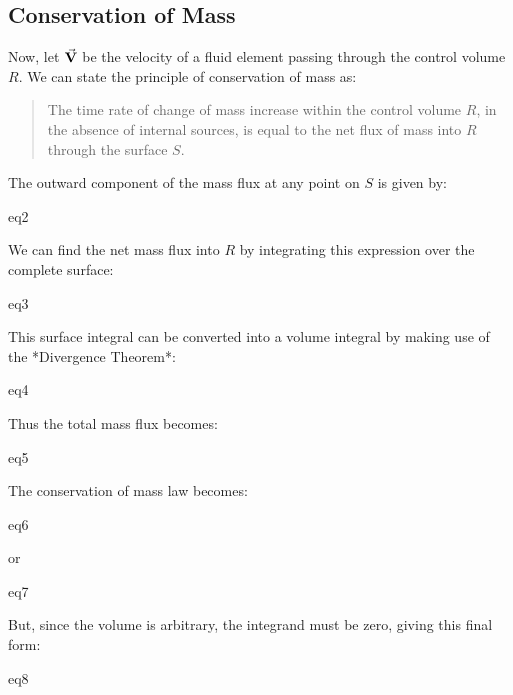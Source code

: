 \subsection{Conservation of Mass}

Now, let $\va{V}$ be the velocity of a fluid element passing
through the control volume $R$. We can state the principle of conservation of
mass as:

\begin{quote}
The time rate of change of mass increase within the control volume $R$, in
the absence of internal sources, is equal to the net flux of mass into $R$
through the surface $S$.
\end{quote}

The outward component of the mass flux at any point on $S$ is given by:

{eq2}

We can find the net mass flux into $R$ by integrating this expression over the
complete surface:

{eq3}

This surface integral can be converted into a volume integral by making use of
the *Divergence Theorem*:

{eq4}

Thus the total mass flux becomes:

{eq5}

The conservation of mass law becomes:
    
{eq6}

or

{eq7}

But, since the volume is arbitrary, the integrand must be zero, giving this final form:

{eq8}


